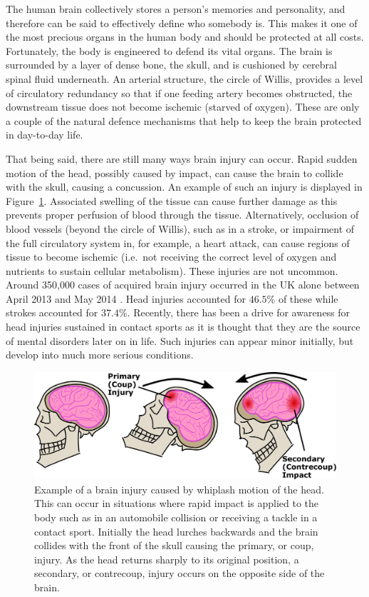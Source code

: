\documentclass[11pt,english,a4paper,twoside,openright]{report}
\begin{document}
{{{{{{{{	The human brain collectively stores a person's memories and personality, and therefore can be said to effectively define who somebody is. This makes it one of the most precious organs in the human body and should be protected at all costs. Fortunately, the body is engineered to defend its vital organs. The brain is surrounded by a layer of dense bone, the skull, and is cushioned by cerebral spinal fluid underneath. An arterial structure, the circle of Willis, provides a level of circulatory redundancy so that if one feeding artery becomes obstructed, the downstream tissue does not become ischemic (starved of oxygen). These are only a couple of the natural defence mechanisms that help to keep the brain protected in day-to-day life.
	
	That being said, there are still many ways brain injury can occur. Rapid sudden motion of the head, possibly caused by impact, can cause the brain to collide with the skull, causing a concussion. An example of such an injury is displayed in Figure~\ref{fig:1HeadImpactDiagram}. Associated swelling of the tissue can cause further damage as this prevents proper perfusion of blood through the tissue. Alternatively, occlusion of blood vessels (beyond the circle of Willis), such as in a stroke, or impairment of the full circulatory system in, for example, a heart attack, can cause regions of tissue to become ischemic (i.e.\ not receiving the correct level of oxygen and nutrients to sustain cellular metabolism). These injuries are not uncommon. Around 350,000 cases of acquired brain injury occurred in the UK alone between April 2013 and May 2014 \cite{headway2014statistics}. Head injuries accounted for $46.5\%$ of these while strokes accounted for $37.4\%$. Recently, there has been a drive for awareness for head injuries sustained in contact sports as it is thought that they are the source of mental disorders later on in life. Such injuries can appear minor initially, but develop into much more serious conditions.
	
	\begin{figure}[h]
		\centering
		\includegraphics[width=\textwidth]{BrainConcussion}
		\caption[Example of whiplash injury]{Example of a brain injury caused by whiplash motion of the head. This can occur in situations where rapid impact is applied to the body such as in an automobile collision or receiving a tackle in a contact sport. Initially the head lurches backwards and the brain collides with the front of the skull causing the primary, or coup, injury. As the head returns sharply to its original position, a secondary, or contrecoup, injury occurs on the opposite side of the brain.}
		\label{fig:1HeadImpactDiagram}
	\end{figure}
	
}}}}}}}}
\end{document}
